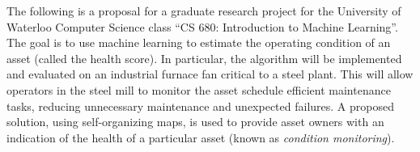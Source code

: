The following is a proposal for a graduate research project for the University of Waterloo Computer Science class ``CS 680: Introduction to Machine Learning''.
The goal is to use machine learning to estimate the operating condition of an asset (called the health score).
In particular, the algorithm will be implemented and evaluated on an industrial furnace fan critical to a steel plant.
This will allow operators in the steel mill to monitor the asset schedule efficient maintenance tasks, reducing unnecessary maintenance and unexpected failures.
A proposed solution, using self-organizing maps, is used to provide asset owners with an indication of the health of a particular asset (known as \textit{condition monitoring}).
